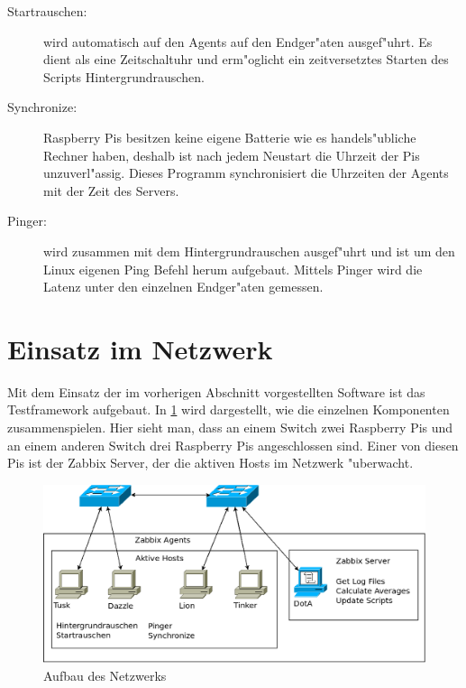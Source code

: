 \begin{enumerate}
\begin{description}
\item[Startrauschen:]wird automatisch auf den Agents auf den Endger"aten ausgef"uhrt. Es dient als eine Zeitschaltuhr %
und erm"oglicht ein zeitversetztes Starten des Scripts Hintergrundrauschen.

\item[Synchronize:]Raspberry Pis besitzen keine eigene Batterie wie es handels"ubliche Rechner haben, %
deshalb ist nach jedem Neustart die Uhrzeit der Pis unzuverl"assig. Dieses Programm synchronisiert %
die Uhrzeiten der Agents mit der Zeit des Servers. %

\item[Pinger:]wird zusammen mit dem Hintergrundrauschen ausgef"uhrt und ist um den Linux eigenen Ping Befehl %
herum aufgebaut. Mittels Pinger wird die Latenz unter den einzelnen Endger"aten gemessen. %
\end{description}
\end{enumerate}
\section{Einsatz im Netzwerk} 

Mit dem Einsatz der im vorherigen Abschnitt vorgestellten Software ist das Testframework aufgebaut. In \cref{fig:AufbauVomNetzwerk} %
wird dargestellt, wie die einzelnen Komponenten zusammenspielen. Hier sieht man, dass an einem Switch zwei Raspberry Pis %
und an einem anderen Switch drei Raspberry Pis angeschlossen sind. Einer von diesen Pis ist der Zabbix Server, der %
die aktiven Hosts im Netzwerk "uberwacht. 

\label{sec:einsatzImNetzwerk}
\begin{figure}[htbp]
\centering
\includegraphics*[width=0.9\linewidth]{Abb/Netzschaltung3}

\caption{Aufbau des Netzwerks}
\label{fig:AufbauVomNetzwerk}
\end{figure}














